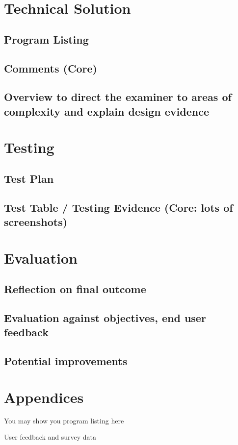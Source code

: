 \documentclass[titlepage]{article}
\begin{document}
\section{Technical Solution}

\subsection{Program Listing}

\subsection{Comments (Core)}

\subsection{Overview to direct the examiner to areas of complexity and explain design evidence}

\section{Testing}

\subsection{Test Plan}

\subsection{Test Table / Testing Evidence (Core: lots of screenshots)}

\section{Evaluation}

\subsection{Reflection on final outcome}

\subsection{Evaluation against objectives, end user feedback}

\subsection{Potential improvements}

\section{Appendices}

You may show you program listing here

User feedback and survey data
\end{document}

